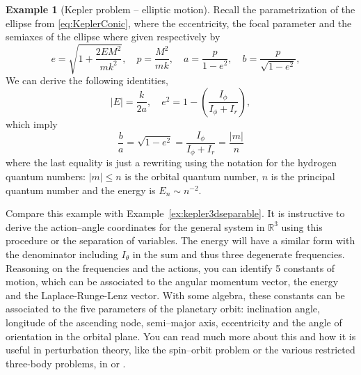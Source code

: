 \documentclass[english,fontsize=11pt,paper=b5]{scrbook}
\numberwithin{equation}{chapter}
\theoremstyle{definition}
\newtheorem{example}{Example}[chapter]
\begin{document}
\begin{example}[Kepler problem -- elliptic motion]
        Recall the parametrization of the ellipse from \eqref{eq:KeplerConic}, where the eccentricity, the focal parameter and the semiaxes of the ellipse where given respectively by
        \begin{equation}
          e = \sqrt{1+ \frac{2EM^2}{mk^2}}, \quad
          p = \frac{M^2}{mk}, \quad
          a = \frac{p}{1-e^2}, \quad
          b = \frac{p}{\sqrt{1-e^2}}, \quad
        \end{equation}
        We can derive the following identities,
        \begin{equation}
          |E| = \frac{k}{2a}, \quad e^2 = 1 - \left(\frac{I_\phi}{ I_\phi + I_r}\right),
        \end{equation}
        which imply
        \begin{equation}
          \frac{b}{a} = \sqrt{1-e^2} = \frac{I_\phi}{I_\phi + I_r} = \frac{|m|}{n}
        \end{equation}
        where the last equality is just a rewriting using the notation for the hydrogen quantum numbers: $|m| \leq n$ is the orbital quantum number, $n$ is the principal quantum number and the energy is $E_n \sim n^{-2}$.

        Compare this example with Example~\ref{ex:kepler3dseparable}.
        It is instructive to derive the action--angle coordinates for the general system in $\mathbb{R}^3$ using this procedure or the separation of variables.
        The energy will have a similar form with the denominator including $I_\theta$ in the sum and thus three degenerate frequencies.
        Reasoning on the frequencies and the actions, you can identify 5 constants of motion, which can be associated to the angular momentum vector, the energy and the Laplace-Runge-Lenz vector.
        With some algebra, these constants can be associated to the five parameters of the planetary orbit: inclination angle, longitude of the ascending node, semi--major axis, eccentricity and the angle of orientation in the orbital plane.
        You can read much more about this and how it is useful in perturbation theory, like the spin--orbit problem or the various restricted three-body problems, in \cite{book:arnoldcelestial} or \cite{book:celletti}.
      \end{example}
\end{document}

